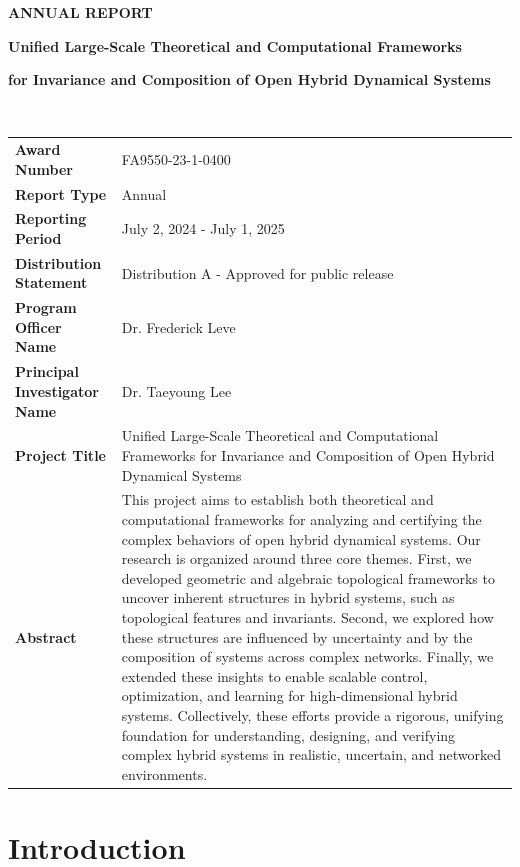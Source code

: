 \documentclass[letterpaper,11pt]{article}
\begin{document}
\thispagestyle{empty}
\noindent\textbf{ANNUAL REPORT}\\[1cm]
\centerline{\textbf{\Large Unified Large-Scale Theoretical and Computational Frameworks}}
\centerline{\textbf{\Large for Invariance and Composition of Open Hybrid Dynamical Systems}}\\[1cm]

\renewcommand\arraystretch{1.5}
\begin{tabularx}{1.0\textwidth}{>{\bfseries}lX}
Award Number & FA9550-23-1-0400\\
Report Type & Annual\\
Reporting Period & July 2, 2024 - July 1, 2025\\
Distribution Statement & Distribution A - Approved for public release\\
Program Officer Name & Dr. Frederick Leve\\
Principal Investigator Name & Dr. Taeyoung Lee\\
Project Title & Unified Large-Scale Theoretical and Computational Frameworks for Invariance and Composition of Open Hybrid Dynamical Systems\\
%
Abstract & 
This project aims to establish both theoretical and computational frameworks for analyzing and certifying the complex behaviors of open hybrid dynamical systems.
Our research is organized around three core themes.
First, we developed geometric and algebraic topological frameworks to uncover inherent structures in hybrid systems, such as topological features and invariants.
Second, we explored how these structures are influenced by uncertainty and by the composition of systems across complex networks.
Finally, we extended these insights to enable scalable control, optimization, and learning for high-dimensional hybrid systems.
Collectively, these efforts provide a rigorous, unifying foundation for understanding, designing, and verifying complex hybrid systems in realistic, uncertain, and networked environments.
\end{tabularx}

\clearpage\newpage

\tableofcontents

\clearpage\newpage
\setcounter{page}{1}
\section{Introduction}
\end{document}
